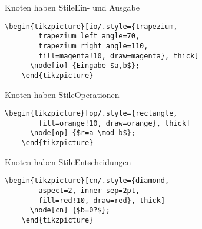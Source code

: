 \begin{Frame}[fragile]{Knoten haben Stile}{Ein- und Ausgabe}

  \xxx

  \begin{lstlisting}[gobble=4]
    \begin{tikzpicture}[io/.style={trapezium,
        trapezium left angle=70,
        trapezium right angle=110,
        fill=magenta!10, draw=magenta}, thick]
      \node[io] {Eingabe $a,b$};
    \end{tikzpicture}
  \end{lstlisting}
\end{Frame}

\begin{Frame}[fragile]{Knoten haben Stile}{Operationen}

  \xxx

  \begin{lstlisting}[gobble=4]
    \begin{tikzpicture}[op/.style={rectangle,
        fill=orange!10, draw=orange}, thick]
      \node[op] {$r=a \mod b$};
    \end{tikzpicture}
  \end{lstlisting}
\end{Frame}

\begin{Frame}[fragile]{Knoten haben Stile}{Entscheidungen}

  \xxx

  \begin{lstlisting}[gobble=4]
    \begin{tikzpicture}[cn/.style={diamond,
        aspect=2, inner sep=2pt,
        fill=red!10, draw=red}, thick]
      \node[cn] {$b=0?$};
    \end{tikzpicture}
  \end{lstlisting}
\end{Frame}

